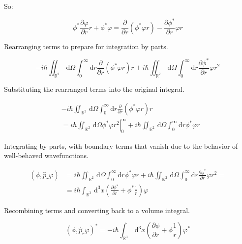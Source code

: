 \documentclass[italian]{HKNdocument}
\begin{document}
So:

\begin{equation}
\phi^{*} \frac{\partial \varphi}{\partial r} r+\phi^{*} \varphi=\frac{\partial}{\partial r}\left(\phi^{*} \varphi r\right)-\frac{\partial \phi^{*}}{\partial r} \varphi r \label{eq:9.21}
\end{equation}

Rearranging terms to prepare for integration by parts.

\begin{equation}
-i \hbar \iint_{\mathbb{R}^{2}} \, \mathrm{d} \Omega \int_{0}^{\infty} \mathrm{d} r \frac{\partial}{\partial r}\left(\phi^{*} \varphi r\right) r+i \hbar \iint_{\mathbb{R}^{2}} \, \mathrm{d} \Omega \int_{0}^{\infty} \mathrm{d} r \frac{\partial \phi^{*}}{\partial r} \varphi r^{2} \label{eq:9.22}
\end{equation}

Substituting the rearranged terms into the original integral.

\begin{align}
& -i \hbar \iint_{\mathbb{R}^{2}} \, \mathrm{d} \Omega \int_{0}^{\infty} \mathrm{d} r \frac{\partial}{\partial r}\left(\phi^{*} \varphi r\right) r \\
& =\left.i \hbar \iint_{\mathbb{R}^{2}} \, \mathrm{d} \Omega \phi^{*} \varphi r^{2}\right|_{0} ^{\infty}+i \hbar \iint_{\mathbb{R}^{2}} \, \mathrm{d} \Omega \int_{0}^{\infty} \mathrm{d} r \phi^{*} \varphi r \label{eq:9.23}
\end{align}

Integrating by parts, with boundary terms that vanish due to the behavior of well-behaved wavefunctions.

\begin{align}
\left(\phi, \hat{p}_{r} \varphi\right) & =i \hbar \iint_{\mathbb{R}^{2}} \, \mathrm{d} \Omega \int_{0}^{\infty} \mathrm{d} r \phi^{*} \varphi r+i \hbar \iint_{\mathbb{R}^{2}} \, \mathrm{d} \Omega \int_{0}^{\infty} \mathrm{d} r \frac{\partial \phi^{*}}{\partial r} \varphi r^{2}=  \label{eq:9.24}\\
& =i \hbar \int_{\mathbb{R}^{3}} \, \mathrm{d}^{3} x\left(\frac{\partial \phi^{*}}{\partial r}+\phi^{*} \frac{1}{r}\right) \varphi
\end{align}

Recombining terms and converting back to a volume integral.

\begin{equation}
\left(\phi, \hat{p}_{r} \varphi\right)^{*}=-i \hbar \int_{\mathbb{R}^{3}} \, \mathrm{d}^{3} x\left(\frac{\partial \phi}{\partial r}+\phi \frac{1}{r}\right) \varphi^{*} \label{eq:9.25}
\end{equation}
\end{document}
